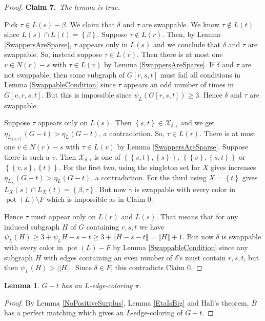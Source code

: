 \documentclass[12pt]{article}
\theoremstyle{plain}
\newtheorem{lem}[thm]{Lemma}
\theoremstyle{definition}
\theoremstyle{remark}
\newcommand{\fancy}[1]{\mathcal{#1}}
\newcommand{\set}[1]{\left\{ #1 \right\}}
\newcommand{\size}[1]{\left\Vert#1\right\Vert}
\newcommand{\pot}{\operatorname{pot}}
\def\X{\fancy{X}}
\newcommand{\claim}[2]{{\bf Claim #1.}~{\it #2}~~}
\begin{document}
\begin{proof}
		\claim{7}{The lemma is true.}
		
			Pick $\tau \in L(s) - \beta$.   We claim that $\delta$ and $\tau$ are swappable.  We know $\tau \not \in L(t)$ since $L(s) \cap L(t) = \set{\beta}$.  Suppose $\tau \not \in L(r)$.  Then, by Lemma \ref{SwappersAreSparse}, $\tau$ appears only in $L(s)$ and we conclude that $\delta$ and $\tau$ are swappable.  So, instead suppose $\tau \in L(r)$.  Then there is at most one $v \in N(r) - s$ with $\tau \in L(v)$ by Lemma \ref{SwappersAreSparse}.  If $\delta$ and $\tau$ are not swappable, then some subgraph of $G[r,s,t]$ must fail all conditions in Lemma \ref{SwappableCondition} since $\tau$ appears an odd number of times in $G[v,r,s,t]$.  But this is impossible since $\psi_L(G[r,s,t]) \ge 3$.  Hence $\delta$ and $\tau$ are swappable.
			
			Suppose $\tau$ appears only on $L(s)$. Then $\set{s,t} \in \X_{\delta,\tau}$ and we get $\eta_{L_{\set{s,t}}}(G - t) > \eta_L(G - t)$, a contradiction.  So, $\tau \in L(r)$.  There is at most one $v \in N(r) - s$ with $\tau \in L(v)$ by Lemma \ref{SwappersAreSparse}.  Suppose there is such a $v$.  Then $\X_{\delta,\tau}$ is one of $\set{\set{v,t}, \set{s}}$, $\set{\set{v}, \set{s, t}}$ or $\set{\set{v,s}, \set{t}}$.  For the first two, using the singleton set for $X$ gives increases $\eta_{L_X}(G - t) > \eta_L(G - t)$, a contradiction.  For the third using $X = \set{t}$ gives $L_X(s) \cap L_X(t) = \set{\beta, \tau}$.  But now $\gamma$ is swappable with every color in $\pot(L) \setminus F$ which is impossible as in Claim 0.  
			
			Hence $\tau$ must appear only on $L(r)$ and $L(s)$.  That means that for any induced subgraph $H$ of $G$ containing $r,s,t$ we have $\psi_L(H) \ge 3 + \psi_L{H-s-t} \ge 3 + \size{H-s-t} = \size{H} + 1$.  But now $\delta$ is swappable with every color in $\pot(L) - F$ by Lemma \ref{SwappableCondition} since any subgraph $H$ with edges containing an even number of $\delta$'s must contain $r,s,t$, but then $\psi_L(H) > ||H||$.  Since $\delta \in F$, this contradicts Claim 0.
	\end{proof}
	
	
	\begin{lem}\label{CanColorG-t}
		$G-t$ has an $L$-edge-coloring $\pi$.
	\end{lem}
	\begin{proof}
		By Lemma \ref{NoPositiveSurplus}, Lemma \ref{EtaIsBig} and Hall's theorem, $B$ has a perfect matching which gives an $L$-edge-coloring of $G-t$.
	\end{proof}
\end{document}
